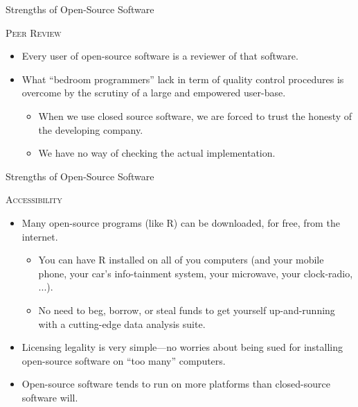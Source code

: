 \documentclass[10pt]{beamer}
\newcommand{\rmsc}[1]{\textrm{\textsc{#1}}}
\begin{document}

\begin{frame}{Strengths of Open-Source Software}

  \rmsc{Peer Review}
  \vb
  \begin{itemize}
  \item Every user of open-source software is a reviewer of that software.
    \vb
  \item What ``bedroom programmers'' lack in term of quality control procedures 
    is overcome by the scrutiny of a large and empowered user-base.
    \vc
    \begin{itemize}
    \item When we use closed source software, we are forced to trust the honesty 
      of the developing company.
      \vb
    \item We have no way of checking the actual implementation.
    \end{itemize}
  \end{itemize}

\end{frame}


\begin{frame}{Strengths of Open-Source Software}

  \rmsc{Accessibility}
  \vb
  \begin{itemize}
  \item Many open-source programs (like R) can be downloaded, for free, from the 
    internet.
    \begin{itemize}
      \vb
    \item You can have R installed on all of you computers (and your mobile 
      phone, your car's info-tainment system, your microwave, your clock-radio,
      ...).
      \vb
    \item No need to beg, borrow, or steal funds to get yourself up-and-running 
      with a cutting-edge data analysis suite.
    \end{itemize}
    \vb
  \item Licensing legality is very simple---no worries about being sued for 
    installing open-source software on ``too many'' computers.
    \vb
  \item Open-source software tends to run on more platforms than closed-source 
    software will.
  \end{itemize}

\end{frame}
\end{document}
